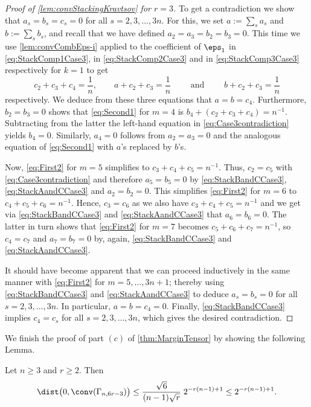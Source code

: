 \begin{proof}[Proof of \cref{lem:convStackingKravtsov} for $r=3$]
To get a contradiction we show that $a_s = b_s = c_s = 0$ for all $s = 2,3,\ldots, 3 n$. For this, we set $a := \sum_{s} a_s$ and $b := \sum_s b_s$, and recall that we have defined $a_2 = a_3 = b_2 = b_3 = 0$. This time we use \cref{lem:convCombEps-i} applied to the coefficient of $\eps_1$ in \eqref{eq:StackComp1Case3}, in \eqref{eq:StackComp2Case3} and in \eqref{eq:StackComp3Case3} respectively for $k=1$ to get
	\begin{equation}\label{eq:Case3contradiction}
	c_2 + c_3 + c_4 = \frac{1}{n}, \qquad
	a + c_2 + c_3 = \frac{1}{n}  \qquad \text{ and } \qquad
	b + c_2 + c_3 = \frac{1}{n}
	\end{equation}
respectively. We deduce from these three equations that $a=b=c_4$. Furthermore, $b_2 = b_3 = 0$ shows that \eqref{eq:Second1} for $m=4$ is $b_4 + (c_2 + c_3 + c_4) = n^{-1}$. Subtracting from the latter the left-hand equation in \eqref{eq:Case3contradiction} yields $b_4 = 0$. Similarly, $a_4 = 0$ follows from $a_2 = a_3 = 0$ and the analogous equation of \eqref{eq:Second1} with $a$'s replaced by $b$'s.

Now, \eqref{eq:First2} for $m=5$ simplifies to $c_3 + c_4 + c_5 = n^{-1}$. Thus, $c_2 = c_5$ with \eqref{eq:Case3contradiction} and therefore $a_5 = b_5 = 0$ by \eqref{eq:StackBandCCase3}, \eqref{eq:StackAandCCase3} and $a_2=b_2=0$. This simplifies \eqref{eq:First2} for $m=6$ to $c_4 + c_5 + c_6 = n^{-1}$. Hence, $c_3 = c_6$ as we also have $c_3 + c_4 + c_5 = n^{-1}$ and we get via \eqref{eq:StackBandCCase3} and \eqref{eq:StackAandCCase3} that $a_6 = b_6 = 0$. The latter in turn shows that \eqref{eq:First2} for $m=7$ becomes $c_5 + c_6 + c_7 = n^{-1}$, so $c_4 = c_7$ and $a_7 = b_7 = 0$ by, again, \eqref{eq:StackBandCCase3} and \eqref{eq:StackAandCCase3}.

It should have become apparent that we can proceed inductively in the same manner with \eqref{eq:First2} for $m=5,\ldots,3n+1$; thereby using \eqref{eq:StackBandCCase3} and \eqref{eq:StackAandCCase3} to deduce $a_s = b_s = 0$ for all $s=2,3,\ldots,3n$. In particular, $a = b = c_4 = 0$. Finally, \cref{eq:StackBandCCase3} implies $c_4 = c_s$ for all $s=2,3,\ldots,3n$, which gives the desired contradiction.
\end{proof}

We finish the proof of part $(c)$ of \cref{thm:MarginTensor} by showing the following Lemma.

\begin{lem}\label{lem:distStackingKravtsov}
Let $n \geq 3$ and $r \geq 2$. Then 
	\begin{align*}
	\dist \big(0, \conv(\Gamma_{n,6 r - 3}) \big) \leq \frac{\sqrt{6}}{(n-1)\sqrt{r}} \; 2^{-r(n-1) + 1} \leq 2^{- r (n-1) + 1} .
	\end{align*}
\end{lem}

